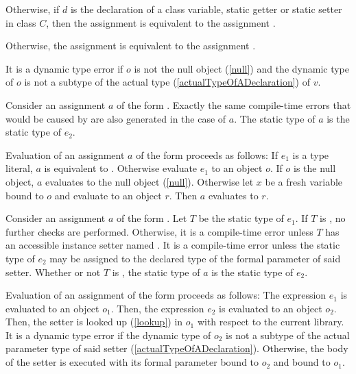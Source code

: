 \documentclass[makeidx]{article}
\begin{document}
\LMHash{}%
Otherwise, if $d$ is the declaration of a class variable, static getter or static setter in class $C$,
then the assignment is equivalent to the assignment .


\LMHash{}%
Otherwise, the assignment is equivalent to the assignment .

\LMHash{}%
It is a dynamic type error if $o$ is not the null object (\ref{null})
and the dynamic type of $o$ is not a subtype of the actual type
(\ref{actualTypeOfADeclaration})
of $v$.

\LMHash{}%
Consider an assignment $a$ of the form .
Exactly the same compile-time errors that would be caused by
 are also generated in the case of $a$.
The static type of $a$ is the static type of $e_2$.

\LMHash{}%
Evaluation of an assignment $a$ of the form 
proceeds as follows:
If $e_1$ is a type literal, $a$ is equivalent to .
Otherwise evaluate $e_1$ to an object $o$.
If $o$ is the null object, $a$ evaluates to the null object (\ref{null}).
Otherwise let $x$ be a fresh variable bound to $o$
and evaluate  to an object $r$.
Then $a$ evaluates to $r$.

\LMHash{}%
Consider an assignment $a$ of the form .
Let $T$ be the static type of $e_1$.
If $T$ is \DYNAMIC{}, no further checks are performed.
Otherwise, it is a compile-time error unless
$T$ has an accessible instance setter named .
It is a compile-time error unless the static type of $e_2$
may be assigned to the declared type of the formal parameter of said setter.
Whether or not $T$ is \DYNAMIC{},
the static type of $a$ is the static type of $e_2$.

\LMHash{}%
Evaluation of an assignment of the form 
proceeds as follows:
The expression $e_1$ is evaluated to an object $o_1$.
Then, the expression $e_2$ is evaluated to an object $o_2$.
Then, the setter  is looked up (\ref{lookup}) in $o_1$ with respect to the current library.
It is a dynamic type error if the dynamic type of $o_2$
is not a subtype of the actual parameter type of said setter
(\ref{actualTypeOfADeclaration}).
Otherwise, the body of the setter is executed with its formal parameter bound to $o_2$ and \THIS{} bound to $o_1$.
\end{document}
